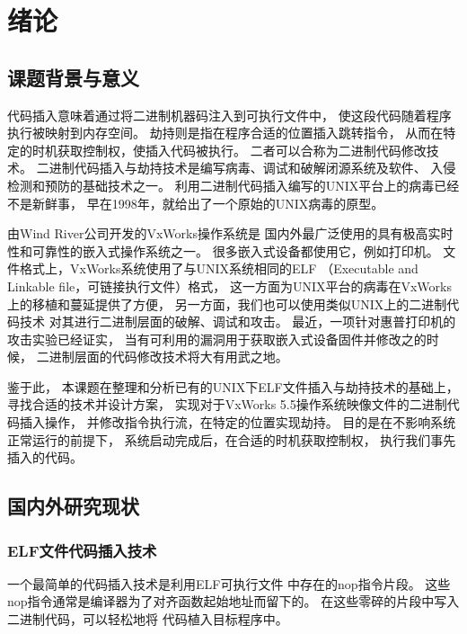 \chapter{绪论}

\section{课题背景与意义}

代码插入意味着通过将二进制机器码注入到可执行文件中，
使这段代码随着程序执行被映射到内存空间。
劫持则是指在程序合适的位置插入跳转指令，
从而在特定的时机获取控制权，使插入代码被执行。
二者可以合称为二进制代码修改技术。
二进制代码插入与劫持技术是编写病毒、调试和破解闭源系统及软件、
入侵检测和预防的基础技术之一。
利用二进制代码插入编写的UNIX平台上的病毒已经不是新鲜事，
早在1998年，\cite{silvio}就给出了一个原始的UNIX病毒的原型。

由Wind River公司开发的VxWorks操作系统是
国内外最广泛使用的具有极高实时性和可靠性的嵌入式操作系统之一。
很多嵌入式设备都使用它，例如打印机。
文件格式上，VxWorks系统使用了与UNIX系统相同的ELF
（Executable and Linkable file，可链接执行文件）格式，
这一方面为UNIX平台的病毒在VxWorks上的移植和蔓延提供了方便，
另一方面，我们也可以使用类似UNIX上的二进制代码技术
对其进行二进制层面的破解、调试和攻击。
最近，一项针对惠普打印机的攻击实验已经证实，
当有可利用的漏洞用于获取嵌入式设备固件并修改之的时候，
二进制层面的代码修改技术将大有用武之地。


鉴于此，
本课题在整理和分析已有的UNIX下ELF文件插入与劫持技术的基础上，
寻找合适的技术并设计方案，
实现对于VxWorks 5.5操作系统映像文件的二进制代码插入操作，
并修改指令执行流，在特定的位置实现劫持。
目的是在不影响系统正常运行的前提下，
系统启动完成后，在合适的时机获取控制权，
执行我们事先插入的代码。

\section{国内外研究现状}

\subsection{ELF文件代码插入技术}

一个最简单的代码插入技术是利用ELF可执行文件
中存在的nop指令片段。
这些nop指令通常是编译器为了对齐函数起始地址而留下的。
在这些零碎的片段中写入二进制代码，可以轻松地将
代码植入目标程序中。

